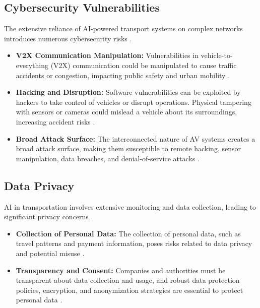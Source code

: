\subsection{Cybersecurity Vulnerabilities}
The extensive reliance of AI-powered transport systems on complex networks introduces numerous cybersecurity risks \cite{Akitra_Cybersecurity}.
\begin{itemize}
    \item \textbf{V2X Communication Manipulation:} Vulnerabilities in vehicle-to-everything (V2X) communication could be manipulated to cause traffic accidents or congestion, impacting public safety and urban mobility \cite{Akitra_Cybersecurity}.
    \item \textbf{Hacking and Disruption:} Software vulnerabilities can be exploited by hackers to take control of vehicles or disrupt operations. Physical tampering with sensors or cameras could mislead a vehicle about its surroundings, increasing accident risks \cite{TechVertu_Cybersecurity}.
    \item \textbf{Broad Attack Surface:} The interconnected nature of AV systems creates a broad attack surface, making them susceptible to remote hacking, sensor manipulation, data breaches, and denial-of-service attacks \cite{MDPI_Cybersecurity}.
\end{itemize}

\subsection{Data Privacy}
AI in transportation involves extensive monitoring and data collection, leading to significant privacy concerns \cite{TechStack_DataPrivacy}.
\begin{itemize}
    \item \textbf{Collection of Personal Data:} The collection of personal data, such as travel patterns and payment information, poses risks related to data privacy and potential misuse \cite{TechStack_DataPrivacy}.
    \item \textbf{Transparency and Consent:} Companies and authorities must be transparent about data collection and usage, and robust data protection policies, encryption, and anonymization strategies are essential to protect personal data \cite{RTSLabs_DataPrivacy}.
\end{itemize}

